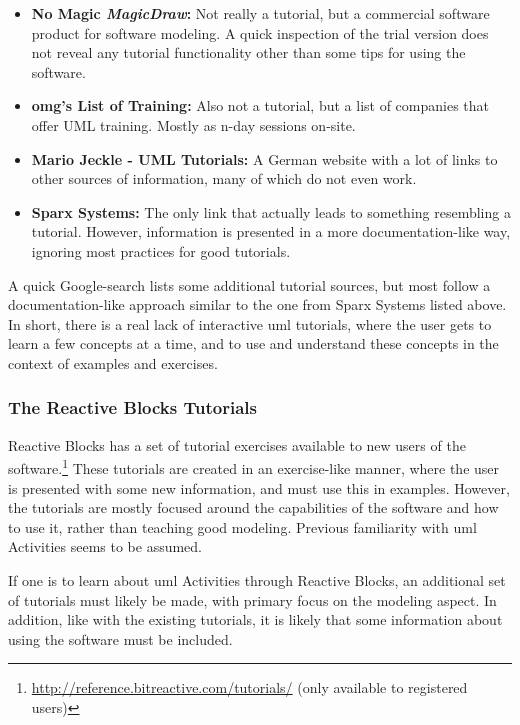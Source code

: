 \begin{itemize}
	\item{\textbf{No Magic \emph{MagicDraw}:}} Not really a tutorial, but a commercial software product for software modeling. A quick inspection of the trial version does not reveal any tutorial functionality other than some tips for using the software.
	\item{\textbf{\gls{omg}'s List of Training:}} Also not a tutorial, but a list of companies that offer UML training. Mostly as n-day sessions on-site.
	\item{\textbf{Mario Jeckle - UML Tutorials:}} A German website with a lot of links to other sources of information, many of which do not even work.
	\item{\textbf{Sparx Systems:}} The only link that actually leads to something resembling a tutorial. However, information is presented in a more documentation-like way, ignoring most practices for good tutorials.
\end{itemize}

\noindent
A quick Google-search lists some additional tutorial sources, but most follow a documentation-like approach similar to the one from Sparx Systems listed above. In short, there is a real lack of interactive \gls{uml} tutorials, where the user gets to learn a few concepts at a time, and to use and understand these concepts in the context of examples and exercises.

\subsubsection{The Reactive Blocks Tutorials}
Reactive Blocks has a set of tutorial exercises available to new users of the software.\footnote{\url{http://reference.bitreactive.com/tutorials/} (only available to registered users)} These tutorials are created in an exercise-like manner, where the user is presented with some new information, and must use this in examples. However, the tutorials are mostly focused around the capabilities of the software and how to use it, rather than teaching good modeling. Previous familiarity with \gls{uml} Activities seems to be assumed.

\noindent
If one is to learn about \gls{uml} Activities through Reactive Blocks, an additional set of tutorials must likely be made, with primary focus on the modeling aspect. In addition, like with the existing tutorials, it is likely that some information about using the software must be included.


